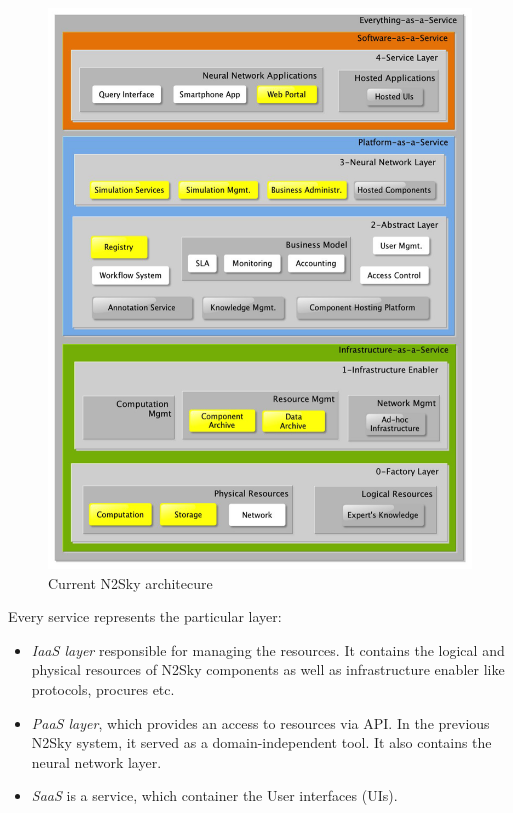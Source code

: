 \begin{figure}[htbp]
\begin{center}
  \includegraphics[width=\linewidth]{components/2/current_arch.png}
  \caption{Current N2Sky architecure}
  \label{fig:current_arch}
\end{center}
\end{figure}

Every service represents the particular layer:
\begin{itemize}
\item \emph{IaaS layer}  responsible for managing the resources. It contains the logical and physical resources of N2Sky components as well as infrastructure enabler like protocols, procures etc. 
\item \emph{PaaS layer}, which provides an access to resources via API. In the previous N2Sky system, it served as a domain-independent tool. It also contains the neural network layer.
\item \emph{SaaS} is a service, which container the User interfaces (UIs).
\end{itemize}

